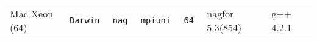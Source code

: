 \begin{tabular}{lllllll}
Mac Xeon (64)         &\tt Darwin &\tt nag          &\tt mpiuni     &\tt 64              & nagfor \footnotesize 5.3(854)       & g++ \footnotesize 4.2.1         \\ %

\end{tabular}
